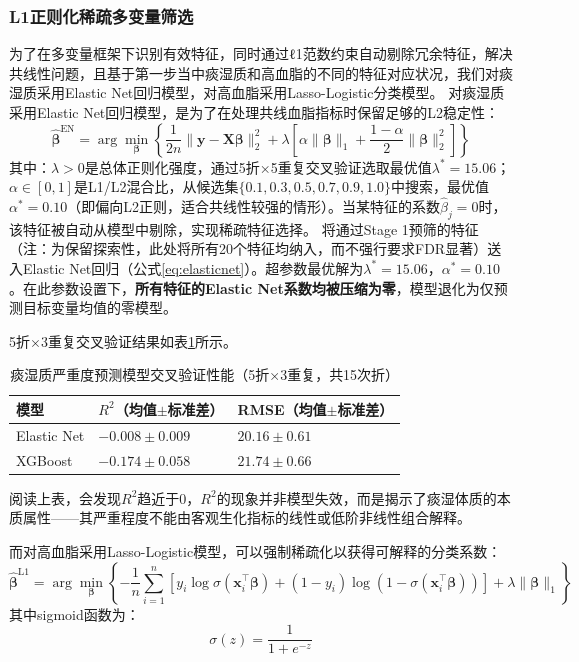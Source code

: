 \documentclass[12pt,a4paper]{ctexart}
\begin{document}
\subsubsection{L1正则化稀疏多变量筛选}
为了在多变量框架下识别有效特征，同时通过ℓ1范数约束自动剔除冗余特征，解决共线性问题，且基于第一步当中痰湿质和高血脂的不同的特征对应状况，我们对痰湿质采用Elastic Net回归模型，对高血脂采用Lasso-Logistic分类模型。
对痰湿质采用Elastic Net回归模型，是为了在处理共线血脂指标时保留足够的L2稳定性：
\begin{equation}
\hat{\bm{\beta}}^{\text{EN}} = \arg\min_{\bm{\beta}} \left\{ \frac{1}{2n}\|\mathbf{y} - \mathbf{X}\bm{\beta}\|_2^2 + \lambda\left[\alpha\|\bm{\beta}\|_1 + \frac{1-\alpha}{2}\|\bm{\beta}\|_2^2\right] \right\}
\label{eq:elasticnet}
\end{equation}
其中：$\lambda > 0$是总体正则化强度，通过5折×5重复交叉验证选取最优值$\lambda^* = 15.06$；$\alpha \in [0, 1]$是L1/L2混合比，从候选集$\{0.1, 0.3, 0.5, 0.7, 0.9, 1.0\}$中搜索，最优值$\alpha^* = 0.10$（即偏向L2正则，适合共线性较强的情形）。当某特征的系数$\hat{\beta}_j = 0$时，该特征被自动从模型中剔除，实现稀疏特征选择。
将通过Stage 1预筛的特征（注：为保留探索性，此处将所有20个特征均纳入，而不强行要求FDR显著）送入Elastic Net回归（公式\ref{eq:elasticnet}）。超参数最优解为$\lambda^* = 15.06$，$\alpha^* = 0.10$。在此参数设置下，\textbf{所有特征的Elastic Net系数均被压缩为零}，模型退化为仅预测目标变量均值的零模型。

5折$\times$3重复交叉验证结果如表\ref{tab:phlegm_cv}所示。

\begin{table}[H]
\centering
\caption{痰湿质严重度预测模型交叉验证性能（5折×3重复，共15次折）}
\label{tab:phlegm_cv}
\begin{tabular}{lll}
\toprule
模型 & $R^2$（均值$\pm$标准差） & RMSE（均值$\pm$标准差） \\
\midrule
Elastic Net & $-0.008 \pm 0.009$ & $20.16 \pm 0.61$ \\
XGBoost     & $-0.174 \pm 0.058$ & $21.74 \pm 0.66$ \\
\bottomrule
\end{tabular}
\end{table}

阅读上表，会发现$R^2$趋近于0，$R^2$的现象并非模型失效，而是揭示了痰湿体质的本质属性——其严重程度不能由客观生化指标的线性或低阶非线性组合解释。

而对高血脂采用Lasso-Logistic模型，可以强制稀疏化以获得可解释的分类系数：
\begin{equation}
\hat{\bm{\beta}}^{\text{L1}} = \arg\min_{\bm{\beta}} \left\{ -\frac{1}{n}\sum_{i=1}^{n}\left[y_i \log \sigma(\mathbf{x}_i^\top\bm{\beta}) + (1-y_i)\log(1-\sigma(\mathbf{x}_i^\top\bm{\beta}))\right] + \lambda\|\bm{\beta}\|_1 \right\}
\label{eq:lasso_logistic}
\end{equation}
其中sigmoid函数为：
\begin{equation}
\sigma(z) = \frac{1}{1 + e^{-z}}
\label{eq:sigmoid}
\end{equation}
\end{document}
